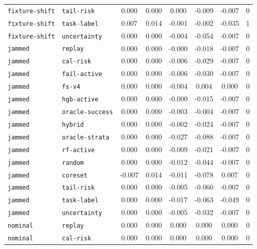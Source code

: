 \documentclass{article}
\begin{document}
\begin{center}
\begin{tabular}{llcccccc}
\texttt{fixture-shift} & \texttt{tail-risk} & 0.000 & 0.000 & 0.000 & -0.009 & -0.007 & 0 \\
\texttt{fixture-shift} & \texttt{task-label} & 0.007 & 0.014 & -0.001 & -0.002 & -0.035 & 1 \\
\texttt{fixture-shift} & \texttt{uncertainty} & 0.000 & 0.000 & -0.004 & -0.054 & -0.007 & 0 \\
\texttt{jammed} & \texttt{replay} & 0.000 & 0.000 & -0.000 & -0.018 & -0.007 & 0 \\
\texttt{jammed} & \texttt{cal-risk} & 0.000 & 0.000 & -0.006 & -0.029 & -0.007 & 0 \\
\texttt{jammed} & \texttt{fail-active} & 0.000 & 0.000 & -0.006 & -0.030 & -0.007 & 0 \\
\texttt{jammed} & \texttt{fs-v4} & 0.000 & 0.000 & -0.004 & 0.004 & 0.000 & 0 \\
\texttt{jammed} & \texttt{hgb-active} & 0.000 & 0.000 & -0.000 & -0.015 & -0.007 & 0 \\
\texttt{jammed} & \texttt{oracle-success} & 0.000 & 0.000 & -0.003 & -0.004 & -0.007 & 0 \\
\texttt{jammed} & \texttt{hybrid} & 0.000 & 0.000 & -0.002 & -0.024 & -0.007 & 0 \\
\texttt{jammed} & \texttt{oracle-strata} & 0.000 & 0.000 & -0.027 & -0.088 & -0.007 & 0 \\
\texttt{jammed} & \texttt{rf-active} & 0.000 & 0.000 & -0.009 & -0.021 & -0.007 & 0 \\
\texttt{jammed} & \texttt{random} & 0.000 & 0.000 & -0.012 & -0.044 & -0.007 & 0 \\
\texttt{jammed} & \texttt{coreset} & -0.007 & 0.014 & -0.011 & -0.078 & 0.007 & 0 \\
\texttt{jammed} & \texttt{tail-risk} & 0.000 & 0.000 & -0.005 & -0.060 & -0.007 & 0 \\
\texttt{jammed} & \texttt{task-label} & 0.000 & 0.000 & -0.017 & -0.063 & -0.049 & 0 \\
\texttt{jammed} & \texttt{uncertainty} & 0.000 & 0.000 & -0.005 & -0.032 & -0.007 & 0 \\
\texttt{nominal} & \texttt{replay} & 0.000 & 0.000 & 0.000 & 0.000 & 0.000 & 0 \\
\texttt{nominal} & \texttt{cal-risk} & 0.000 & 0.000 & 0.000 & 0.000 & 0.000 & 0 \\
\bottomrule
\end{tabular}
\end{center}
\end{document}

